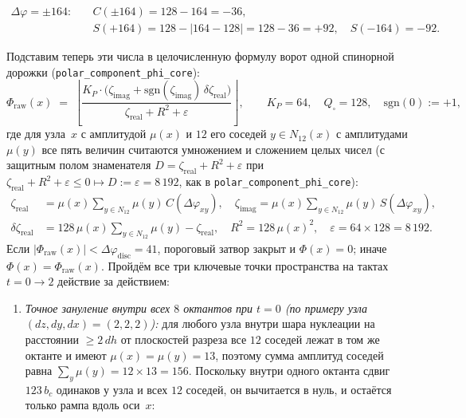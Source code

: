 \begin{corollary}[Единство природы и количества заряда: частное и остаток одного деления на $\phaseRingCount = 512$]
\begin{enumerate}[label=(\roman*)]
\begin{itemize}[nosep,leftmargin=*]
\begin{align*}
      \Delta\varphi = \pm 164\colon &\quad C(\pm 164) = 128 - 164 = -36,\\
      &\quad S(+164) = 128 - |164-128| = 128 - 36 = +92,\quad S(-164) = -92.
    \end{align*}
  \end{itemize}
  Подставим теперь эти числа в целочисленную формулу ворот одной спинорной дорожки (\texttt{polar\_component\_phi\_core}):
  \begin{equation}
  \label{eq:explicit-gate-formula-step0}
    \Phi_{\mathrm{raw}}(x)
    \;=\;
    \left\lfloor
      \frac{K_P\cdot\bigl(\zeta_{\mathrm{imag}} + \mathrm{sgn}(\zeta_{\mathrm{imag}})\,\delta\zeta_{\mathrm{real}}\bigr)}{\zeta_{\mathrm{real}} + R^2 + \varepsilon}
    \right\rfloor,
    \qquad
    K_P = 64,\quad Q_\square = 128,\quad \mathrm{sgn}(0) := +1,
  \end{equation}
  где для узла~$x$ с амплитудой $\mu(x)$ и $12$ его соседей $y\in N_{12}(x)$ с амплитудами $\mu(y)$ все пять величин считаются умножением и сложением целых чисел (с защитным полом знаменателя $D = \zeta_{\mathrm{real}}+R^2+\varepsilon$ при $\zeta_{\mathrm{real}}+R^2+\varepsilon \le 0 \mapsto D := \varepsilon = 8\,192$, как в \texttt{polar\_component\_phi\_core}):
  \begin{align*}
    \zeta_{\mathrm{real}} &= \mu(x)\sum_{y\in N_{12}}\mu(y)\,C(\Delta\varphi_{xy}),\quad
    \zeta_{\mathrm{imag}} = \mu(x)\sum_{y\in N_{12}}\mu(y)\,S(\Delta\varphi_{xy}),\\
    \delta\zeta_{\mathrm{real}} &= 128\,\mu(x)\sum_{y\in N_{12}}\mu(y) - \zeta_{\mathrm{real}},\quad
    R^2 = 128\,\mu(x)^2,\quad \varepsilon = 64\times 128 = 8\,192.
  \end{align*}
  Если $|\Phi_{\mathrm{raw}}(x)| < \Delta\varphi_{\mathrm{disc}} = 41$, пороговый затвор закрыт и $\Phi(x) = 0$; иначе $\Phi(x) = \Phi_{\mathrm{raw}}(x)$.
  Пройдём все три ключевые точки пространства на тактах $t=0\to 2$ действие за действием:
  \begin{enumerate}[label=(\alph*),nosep]
  \item \emph{Точное зануление внутри всех $8$ октантов при $t=0$ (по примеру узла $(dz,dy,dx)=(2,2,2)$):}
    для любого узла внутри шара нуклеации на расстоянии $\ge 2\,dh$ от плоскостей разреза все $12$ соседей лежат в том же октанте и имеют $\mu(x)=\mu(y)=13$, поэтому сумма амплитуд соседей равна $\sum_{y}\mu(y) = 12\times 13 = 156$.
    Поскольку внутри одного октанта сдвиг $123\,b_c$ одинаков у узла и всех $12$ соседей, он вычитается в нуль, и остаётся только рампа вдоль оси~$x$:

\end{enumerate}
\end{enumerate}
\end{corollary}
